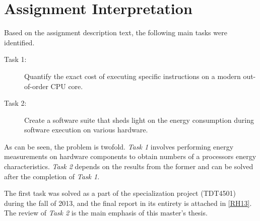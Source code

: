 \section{Assignment Interpretation}

Based on the assignment description text, the following main tasks were
identified.

\begin{description}
    \item[Task 1:] Quantify the exact cost of executing specific instructions on
        a modern out-of-order CPU core.
    \item[Task 2:] Create a software suite that sheds light on the energy
        consumption during software execution on various hardware.
\end{description}

As can be seen, the problem is twofold. \textit{Task 1} involves performing energy
measurements on hardware components to obtain numbers of a processors energy
characteristics. \textit{Task 2} depends on the results from the former and can
be solved after the completion of \textit{Task 1}.

The first task was solved as a part of the specialization project (TDT4501)
during the fall of 2013, and the final report in its entirety is attached in
\autoref{RH13}. The review of \textit{Task 2} is the main emphasis of this
master's thesis.
